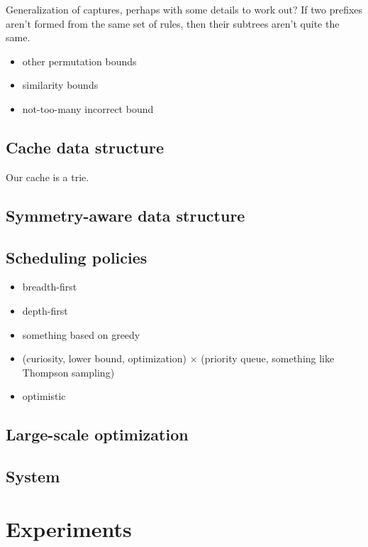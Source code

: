 Generalization of captures, perhaps with some details to work out?
If two prefixes aren't formed from the same set of rules, then their subtrees aren't quite the same.

\begin{itemize}
\item other permutation bounds
\item similarity bounds
\item not-too-many incorrect bound
\end{itemize}

\subsection{Cache data structure}
\label{sec:cache}

Our cache is a trie.

\subsection{Symmetry-aware data structure}

\subsection{Scheduling policies}

\begin{itemize}
\item breadth-first
\item depth-first
\item something based on greedy
\item (curiosity, lower bound, optimization) $\times$ (priority queue, something like Thompson sampling)
\item optimistic
\end{itemize}

\subsection{Large-scale optimization}

\subsection{System}

\section{Experiments}

